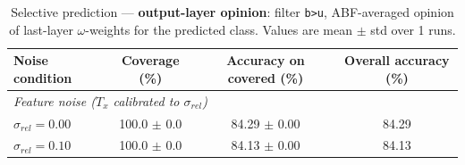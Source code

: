 \begin{table}[ht]
\centering
\caption{Selective prediction — \textbf{output-layer opinion}: filter \texttt{b>u}, ABF-averaged opinion of last-layer $\omega$-weights for the predicted class. Values are mean $\pm$ std over 1 runs.}
\label{tab:thresh-out-0-5}
\begin{tabular}{lccc}
\toprule
Noise condition & Coverage (\%) & Accuracy on covered (\%) & Overall accuracy (\%) \\
\midrule
\multicolumn{4}{l}{\textit{Feature noise ($T_x$ calibrated to $\sigma_{rel}$)}} \\
$\sigma_{rel}=0.00$ & 100.0 $\pm$ 0.0 & 84.29 $\pm$ 0.00 & 84.29 \\
$\sigma_{rel}=0.10$ & 100.0 $\pm$ 0.0 & 84.13 $\pm$ 0.00 & 84.13 \\
\bottomrule
\end{tabular}
\end{table}